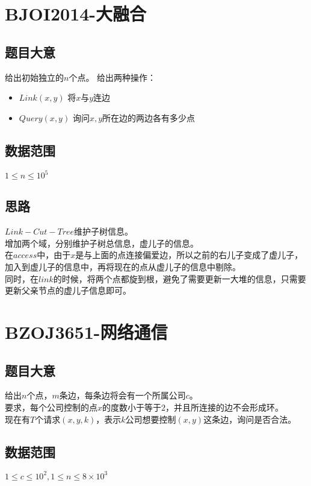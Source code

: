 \documentclass{ctexart}
\numberwithin{equation}{section}
\begin{document}
\begin{flushleft}
  \section{BJOI2014-大融合}
  \subsection{题目大意}
  给出初始独立的$n$个点。
  给出两种操作：\\
  \begin{itemize}
  \item $Link(x, y)$ 将$x$与$y$连边
  \item $Query(x, y)$ 询问$x,y$所在边的两边各有多少点
  \end{itemize}
  \subsection{数据范围}
  $1\le n \le 10^5$
  \subsection{思路}
  $Link-Cut-Tree$维护子树信息。\\
  增加两个域，分别维护子树总信息，虚儿子的信息。\\
  在$access$中，由于$x$是与上面的点连接偏爱边，所以之前的右儿子变成了虚儿子，加入到虚儿子的信息中，再将现在的点从虚儿子的信息中剔除。\\
  同时，在$link$的时候，将两个点都旋到根，避免了需要更新一大堆的信息，只需要更新父亲节点的虚儿子信息即可。

  \section{BZOJ3651-网络通信}
  \subsection{题目大意}
  给出$n$个点，$m$条边，每条边将会有一个所属公司$c$。\\
  要求，每个公司控制的点$x$的度数小于等于$2$，并且所连接的边不会形成环。\\
  现在有$T$个请求$(x,y,k)$，表示$k$公司想要控制$(x,y)$这条边，询问是否合法。\\
  \subsection{数据范围}
  $1\le c \le 10^2, 1 \le n\le 8\times 10^3$

\end{flushleft}
\end{document}
